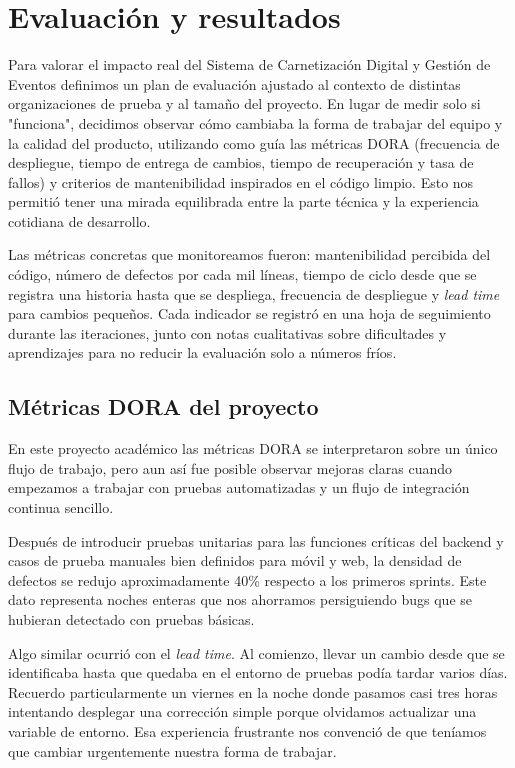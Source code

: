 \section{Evaluación y resultados}

Para valorar el impacto real del Sistema de Carnetización Digital y Gestión de Eventos definimos un plan de evaluación ajustado al contexto de distintas organizaciones de prueba y al tamaño del proyecto. En lugar de medir solo si "funciona", decidimos observar cómo cambiaba la forma de trabajar del equipo y la calidad del producto, utilizando como guía las métricas DORA (frecuencia de despliegue, tiempo de entrega de cambios, tiempo de recuperación y tasa de fallos) y criterios de mantenibilidad inspirados en el código limpio. Esto nos permitió tener una mirada equilibrada entre la parte técnica y la experiencia cotidiana de desarrollo.

Las métricas concretas que monitoreamos fueron: mantenibilidad percibida del código, número de defectos por cada mil líneas, tiempo de ciclo desde que se registra una historia hasta que se despliega, frecuencia de despliegue y \textit{lead time} para cambios pequeños. Cada indicador se registró en una hoja de seguimiento durante las iteraciones, junto con notas cualitativas sobre dificultades y aprendizajes para no reducir la evaluación solo a números fríos.

\subsection{Métricas DORA del proyecto}

En este proyecto académico las métricas DORA se interpretaron sobre un único flujo de trabajo, pero aun así fue posible observar mejoras claras cuando empezamos a trabajar con pruebas automatizadas y un flujo de integración continua sencillo.

Después de introducir pruebas unitarias para las funciones críticas del backend y casos de prueba manuales bien definidos para móvil y web, la densidad de defectos se redujo aproximadamente 40\% respecto a los primeros sprints. Este dato representa noches enteras que nos ahorramos persiguiendo bugs que se hubieran detectado con pruebas básicas.

Algo similar ocurrió con el \textit{lead time}. Al comienzo, llevar un cambio desde que se identificaba hasta que quedaba en el entorno de pruebas podía tardar varios días. Recuerdo particularmente un viernes en la noche donde pasamos casi tres horas intentando desplegar una corrección simple porque olvidamos actualizar una variable de entorno. Esa experiencia frustrante nos convenció de que teníamos que cambiar urgentemente nuestra forma de trabajar.

